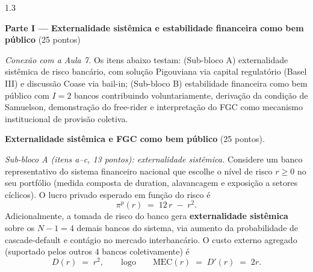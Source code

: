 \documentclass[11pt,addpoints]{exam}
\newcommand{\MEC}{\text{MEC}}
\begin{document}
\begin{spacing}{1.3}

\begin{center}\large\textbf{Parte I --- Externalidade sistêmica e estabilidade financeira como bem público} \quad (25 pontos)\end{center}

\textit{Conexão com a Aula 7.} Os itens abaixo testam: (Sub-bloco A) externalidade sistêmica de risco bancário, com solução Pigouviana via capital regulatório (Basel III) e discussão Coase via bail-in; (Sub-bloco B) estabilidade financeira como bem público com $I = 2$ bancos contribuindo voluntariamente, derivação da condição de Samuelson, demonstração do free-rider e interpretação do FGC como mecanismo institucional de provisão coletiva.

\begin{questions}
\question \textbf{Externalidade sistêmica e FGC como bem público} (25 pontos).

\noindent\emph{Sub-bloco A (itens a--c, 13 pontos): externalidade sistêmica.} Considere um banco representativo do sistema financeiro nacional que escolhe o nível de risco $r \geq 0$ no seu portfólio (medida composta de duration, alavancagem e exposição a setores cíclicos). O lucro privado esperado em função do risco é
\[
    \pi^p(r) \;=\; 12\, r \;-\; r^2.
\]
Adicionalmente, a tomada de risco do banco gera \textbf{externalidade sistêmica} sobre os $N - 1 = 4$ demais bancos do sistema, via aumento da probabilidade de cascade-default e contágio no mercado interbancário. O custo externo agregado (suportado pelos outros $4$ bancos coletivamente) é
\[
    D(r) \;=\; r^2,\qquad \text{logo}\qquad \MEC(r) \;=\; D'(r) \;=\; 2 r.
\]

\end{questions}
\end{spacing}
\end{document}
